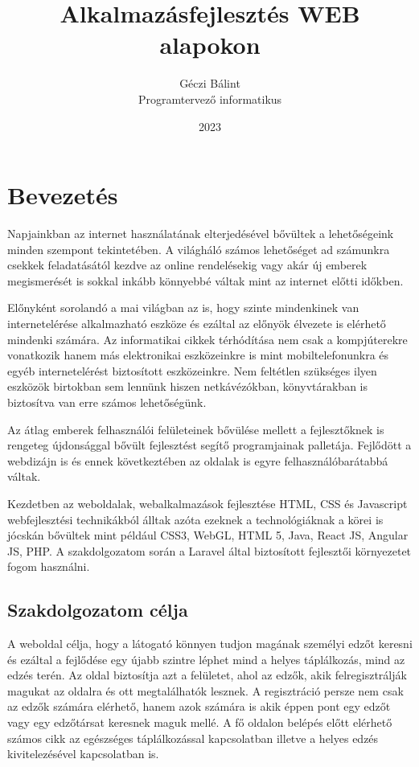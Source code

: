 \documentclass[
]{thesis-ekf}
\theoremstyle{definition}
\theoremstyle{remark}
\begin{document}
	\title{Alkalmazásfejlesztés WEB alapokon}
	\author{Géczi Bálint\\Programtervező informatikus}
	\date{2023}
	\maketitle
	\tableofcontents
	
	\chapter{Bevezetés}
	Napjainkban az internet használatának elterjedésével bővültek a lehetőségeink minden szempont tekintetében. A világháló számos lehetőséget ad számunkra csekkek feladatásától kezdve az online rendelésekig vagy akár új emberek megismerését is sokkal inkább könnyebbé váltak mint az internet előtti időkben. 
	
	Előnyként sorolandó a mai világban az is, hogy szinte mindenkinek van internetelérése alkalmazható eszköze és ezáltal az előnyök élvezete is elérhető mindenki számára. Az informatikai cikkek térhódítása nem csak a kompjúterekre vonatkozik hanem más elektronikai eszközeinkre is mint mobiltelefonunkra és egyéb internetelérést biztosított eszközeinkre. Nem feltétlen szükséges ilyen eszközök birtokban sem lennünk hiszen netkávézókban, könyvtárakban is biztosítva van erre számos lehetőségünk.
	
	Az átlag emberek felhasználói felületeinek bővülése mellett a fejlesztőknek is rengeteg újdonsággal bővült fejlesztést segítő programjainak palletája. Fejlődött a webdizájn is és ennek következtében az oldalak is egyre felhasználóbarátabbá váltak.
	
	Kezdetben az weboldalak, webalkalmazások fejlesztése HTML, CSS és Javascript webfejlesztési technikákból álltak azóta ezeknek a technológiáknak a körei is jócskán bővültek mint például CSS3, WebGL, HTML 5, Java, React JS, Angular JS, PHP. A szakdolgozatom során a Laravel által biztosított fejlesztői környezetet fogom használni.
	
	\section{Szakdolgozatom célja}
	A weboldal célja, hogy a látogató könnyen tudjon magának személyi edzőt keresni és ezáltal a fejlődése egy újabb szintre léphet mind a helyes táplálkozás, mind az edzés terén. Az oldal biztosítja azt a felületet, ahol az edzők, akik felregisztrálják magukat az oldalra és ott megtalálhatók lesznek. A regisztráció persze nem csak az edzők számára elérhető, hanem azok számára is akik éppen pont egy edzőt vagy egy edzőtársat keresnek maguk mellé. A fő oldalon belépés előtt elérhető számos cikk az egészséges táplálkozással kapcsolatban illetve a helyes edzés kivitelezésével kapcsolatban is.
	
\end{document}
